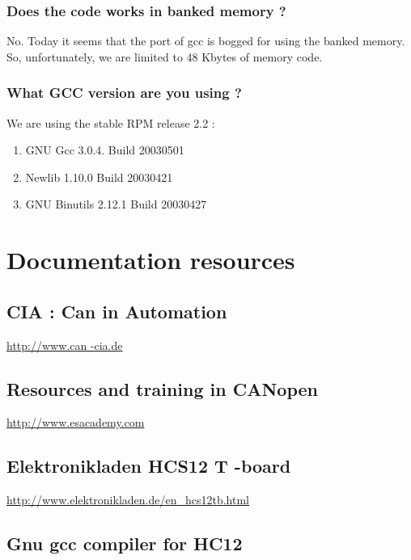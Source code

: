 \documentclass[12pt,english,a4paper]{book}
\newcommand{\canopen}{CANopen }
\begin{document}
\subsubsection{Does the code works in banked memory ?}

No. Today it seems that the port of gcc is bogged for using the banked
memory. So, unfortunately, we are limited to 48 Kbytes of memory code.


\subsubsection{What GCC version are you using ?}

We are using the stable RPM release 2.2 :

\begin{enumerate}
\item GNU Gcc 3.0.4. Build 20030501 
\item Newlib 1.10.0 Build 20030421 
\item GNU Binutils 2.12.1 Build 20030427 
\end{enumerate}

\section{Documentation resources}


\subsection{CIA : Can in Automation }

\href{http://www.can-cia.de/}{http://www.can -cia.de}


\subsection{Resources and training in \canopen 
}

\href{http://www.esacademy.com/}{http://www.esacademy.com}


\subsection{Elektronikladen HCS12 T -board }

\href{http://www.elektronikladen.de/en_hcs12tb.html}{http://www.elektronikladen.de/en\_hcs12tb.html}


\subsection{Gnu gcc compiler for HC12 }
\end{document}
